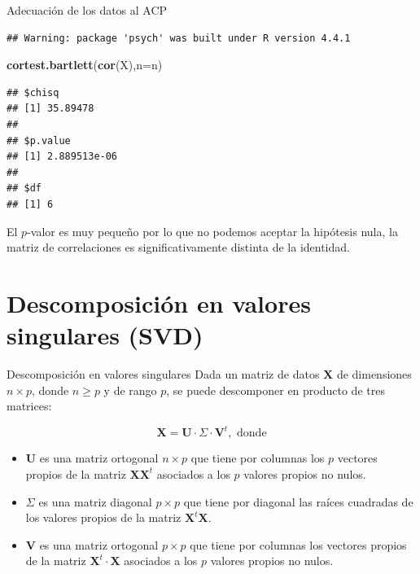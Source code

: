 \documentclass[
  ignorenonframetext,
]{beamer}
\newenvironment{Shaded}{\begin{snugshade}}{\end{snugshade}}
\newcommand{\AttributeTok}[1]{\textcolor[rgb]{0.13,0.29,0.53}{#1}}
\newcommand{\FunctionTok}[1]{\textcolor[rgb]{0.13,0.29,0.53}{\textbf{#1}}}
\newcommand{\NormalTok}[1]{#1}
\providecommand{\tightlist}{%
  \setlength{\itemsep}{0pt}\setlength{\parskip}{0pt}}
\begin{document}
\begin{frame}[fragile]{Adecuación de los datos al ACP}
\begin{verbatim}
## Warning: package 'psych' was built under R version 4.4.1
\end{verbatim}

\begin{Shaded}
\begin{Highlighting}[]
\FunctionTok{cortest.bartlett}\NormalTok{(}\FunctionTok{cor}\NormalTok{(X),}\AttributeTok{n=}\NormalTok{n)}
\end{Highlighting}
\end{Shaded}

\begin{verbatim}
## $chisq
## [1] 35.89478
## 
## $p.value
## [1] 2.889513e-06
## 
## $df
## [1] 6
\end{verbatim}

El \(p\)-valor es muy pequeño por lo que no podemos aceptar la hipótesis
nula, la matriz de correlaciones es significativamente distinta de la
identidad.
\end{frame}

\section{Descomposición en valores singulares
(SVD)}\label{descomposiciuxf3n-en-valores-singulares-svd}

\begin{frame}{Descomposición en valores singulares}
\label{descomposiciuxf3n-en-valores-singulares}
Dada un matriz de datos \(\mathbf{X}\) de dimensiones \(n\times p\),
donde \(n\geq p\) y de rango \(p\), se puede descomponer en producto de
tres matrices:

\[
\mathbf{X}=\mathbf{U}\cdot \Sigma\cdot \mathbf{V}^t, \mbox{ donde}
\]

\begin{itemize}
\tightlist
\item
  \(\mathbf{U}\) es una matriz ortogonal \(n\times p\) que tiene por
  columnas los \(p\) vectores propios de la matriz
  \(\mathbf{X}\mathbf{X}^t\) asociados a los \(p\) valores propios no
  nulos.
\item
  \({\Sigma}\) es una matriz diagonal \(p\times p\) que tiene por
  diagonal las raíces cuadradas de los valores propios de la matriz
  \(\mathbf{X}^t\mathbf{X}\).
\item
  \(\mathbf{V}\) es una matriz ortogonal \(p\times p\) que tiene por
  columnas los vectores propios de la matriz
  \(\mathbf{X}^t\cdot \mathbf{X}\) asociados a los \(p\) valores propios
  no nulos.
\end{itemize}
\end{frame}
\end{document}
